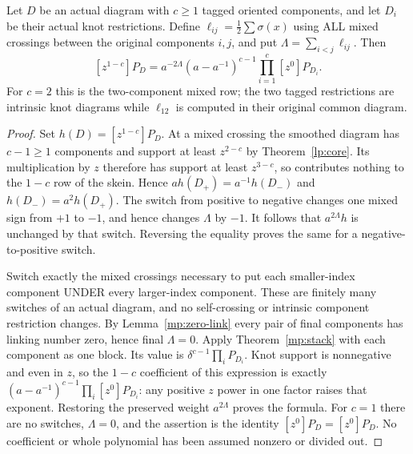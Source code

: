 \begin{theorem}\label{mp:lowest}\leanok
Let $D$ be an actual diagram with $c\geq1$ tagged oriented components,
and let $D_i$ be their actual knot restrictions. Define
$\ell_{ij}=\tfrac12\sum\sigma(x)$ using ALL mixed crossings between
the original components $i,j$, and put $\Lambda=\sum_{i<j}\ell_{ij}$.
Then
\begin{equation}\label{mp:lowest-value}
 [z^{1-c}]P_D
 =a^{-2\Lambda}(a-a^{-1})^{c-1}
       \prod_{i=1}^c[z^0]P_{D_i}.
\end{equation}
For $c=2$ this is the two-component mixed row; the two
tagged restrictions are intrinsic knot diagrams while $\ell_{12}$ is
computed in their original common diagram.

\end{theorem}
\begin{proof}\leanok{}
Set $h(D)=[z^{1-c}]P_D$. At a mixed crossing the smoothed diagram has
$c-1\geq1$ components and support at least $z^{2-c}$ by
Theorem~\ref{lp:core}. Its multiplication by $z$ therefore has
support at least $z^{3-c}$, so contributes nothing to the $1-c$ row
of the skein. Hence $a h(D_+)=a^{-1}h(D_-)$ and
$h(D_-)=a^2h(D_+)$. The switch from positive to negative changes one
mixed sign from $+1$ to $-1$, and hence changes $\Lambda$ by $-1$.
It follows that $a^{2\Lambda}h$ is unchanged by that switch. Reversing
the equality proves the same for a negative-to-positive switch.

Switch exactly the mixed crossings necessary to put each smaller-index
component UNDER every larger-index component. These are finitely many
switches of an actual diagram, and no self-crossing or intrinsic
component restriction changes. By Lemma~\ref{mp:zero-link} every pair
of final components has linking number zero, hence final $\Lambda=0$.
Apply Theorem~\ref{mp:stack} with each component as one block. Its
value is $\delta^{c-1}\prod_iP_{D_i}$. Knot support is nonnegative
and even in $z$, so the $1-c$ coefficient of this expression is exactly
$(a-a^{-1})^{c-1}\prod_i[z^0]P_{D_i}$: any positive $z$ power in one
factor raises that exponent. Restoring the preserved weight
$a^{2\Lambda}$ proves the formula. For $c=1$ there are no switches,
$\Lambda=0$, and the assertion is the identity $[z^0]P_D=[z^0]P_D$.
No coefficient or whole polynomial has been assumed nonzero or divided out.
\end{proof}

